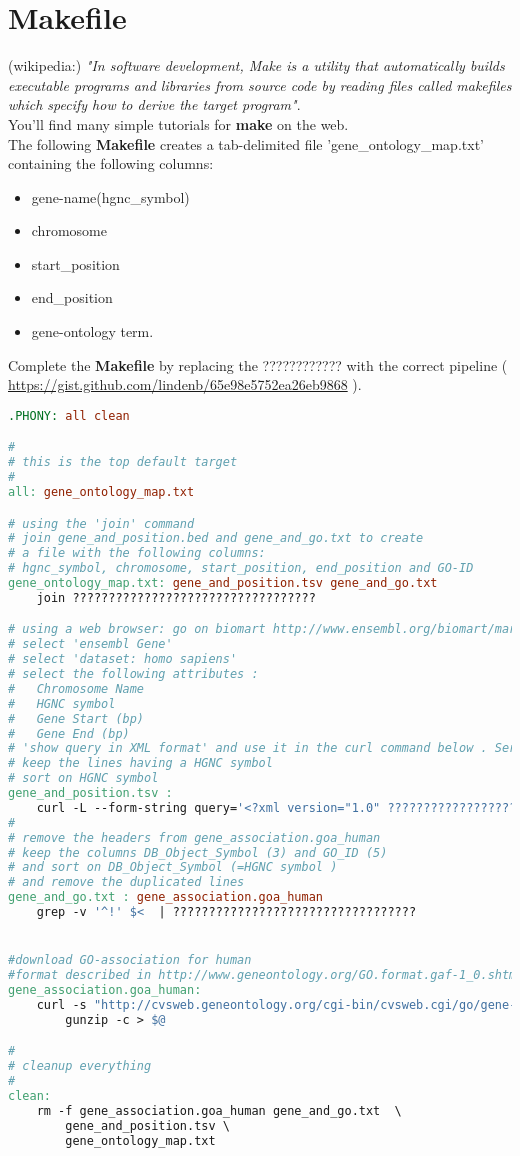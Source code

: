 \documentclass{article}
\begin{document}
\section{Makefile}
\noindent
(wikipedia:) \emph{"In software development, Make is a utility that automatically builds executable programs and libraries from source code by reading files called makefiles which specify how to derive the target program"}.\\You'll find many simple tutorials for \textbf{make} on the web.\\
The following \textbf{Makefile} creates a tab-delimited file 'gene\_ontology\_map.txt' containing the following columns:
\begin{itemize}
\item gene-name(hgnc\_symbol)
\item chromosome
\item start\_position
\item end\_position
\item gene-ontology term.
\end{itemize}
Complete the \textbf{Makefile} by replacing the ???????????? with the correct pipeline ( \url{https://gist.github.com/lindenb/65e98e5752ea26eb9868} ).

\begin{lstlisting}[language=make]
.PHONY: all clean

#
# this is the top default target
#
all: gene_ontology_map.txt

# using the 'join' command
# join gene_and_position.bed and gene_and_go.txt to create 
# a file with the following columns:  
# hgnc_symbol, chromosome, start_position, end_position and GO-ID
gene_ontology_map.txt: gene_and_position.tsv gene_and_go.txt
	join ??????????????????????????????????

# using a web browser: go on biomart http://www.ensembl.org/biomart/martview/
# select 'ensembl Gene'
# select 'dataset: homo sapiens'
# select the following attributes : 
#	Chromosome Name
#	HGNC symbol 
#	Gene Start (bp)
#	Gene End (bp)
# 'show query in XML format' and use it in the curl command below . Service URL is "http://www.biomart.org/biomart/martservice/result"
# keep the lines having a HGNC symbol
# sort on HGNC symbol 
gene_and_position.tsv : 
	curl -L --form-string query='<?xml version="1.0" ?????????????????????????????????? 
#
# remove the headers from gene_association.goa_human
# keep the columns DB_Object_Symbol (3) and GO_ID (5)
# and sort on DB_Object_Symbol (=HGNC symbol )
# and remove the duplicated lines
gene_and_go.txt : gene_association.goa_human
	grep -v '^!' $<  | ??????????????????????????????????


#download GO-association for human
#format described in http://www.geneontology.org/GO.format.gaf-1_0.shtml
gene_association.goa_human:
	curl -s "http://cvsweb.geneontology.org/cgi-bin/cvsweb.cgi/go/gene-associations/$@.gz?rev=HEAD" |\
		gunzip -c > $@

#
# cleanup everything
#
clean:
	rm -f gene_association.goa_human gene_and_go.txt  \
		gene_and_position.tsv \
		gene_ontology_map.txt
\end{lstlisting}
\end{document}
